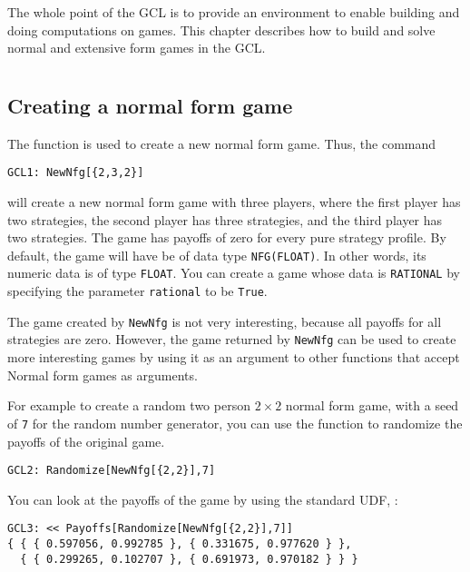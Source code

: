 The whole point of the GCL is to provide an environment to enable
building and doing computations on games.  This chapter describes how
to build and solve normal and extensive form games in the GCL.  

\section{}

\subsection{Creating a normal form game}

The function  is used to create a new normal form game.
Thus, the command

\begin{verbatim}
GCL1: NewNfg[{2,3,2}]
\end{verbatim}

\noindent 
will create a new normal form game with three players, where the first
player has two strategies, the second player has three strategies, and
the third player has two strategies.  The game has payoffs of zero for
every pure strategy profile.  By default, the game will have be of
data type \verb+NFG(FLOAT)+.  In other words, its numeric data is of
type \verb+FLOAT+.  You can create a game whose data is
\verb+RATIONAL+ by specifying the parameter \verb+rational+ to be
\verb+True+.

The game created by \verb+NewNfg+ is not very interesting, because all
payoffs for all strategies are zero.  However, the game returned by
\verb+NewNfg+ can be used to create more interesting games by using it
as an argument to other functions that accept Normal form games as
arguments.

For example to create a random two person $2\times 2$ normal form
game, with a seed of \verb+7+ for the random number generator, you can
use the function  to randomize the payoffs of the
original game.

\begin{verbatim}
GCL2: Randomize[NewNfg[{2,2}],7]
\end{verbatim}  

\noindent
You can look at the payoffs of the game by using the standard UDF,
:

\begin{verbatim}
GCL3: << Payoffs[Randomize[NewNfg[{2,2}],7]]
{ { { 0.597056, 0.992785 }, { 0.331675, 0.977620 } },
  { { 0.299265, 0.102707 }, { 0.691973, 0.970182 } } }
\end{verbatim}  

